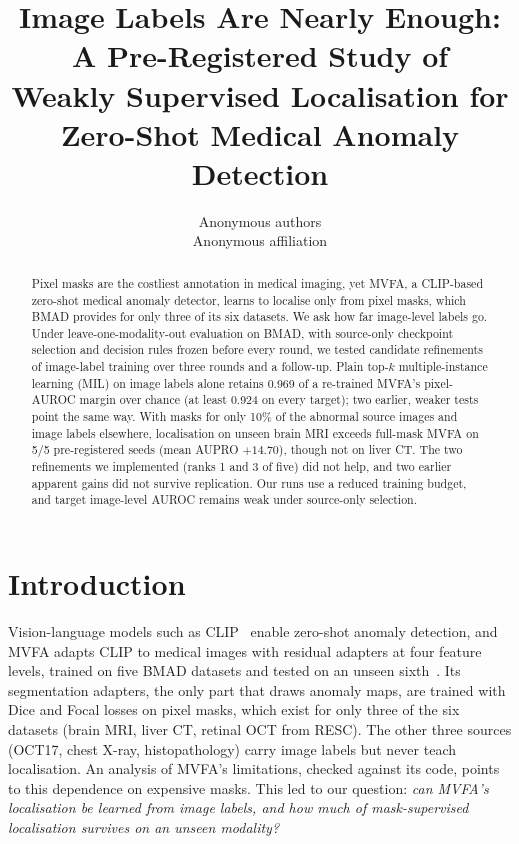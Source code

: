 \documentclass[10pt,twocolumn,letterpaper]{article}
\title{Image Labels Are Nearly Enough: A Pre-Registered Study of\\Weakly Supervised Localisation for Zero-Shot Medical Anomaly Detection}
\author{Anonymous authors\\Anonymous affiliation}
\begin{document}
\maketitle
\begin{abstract}
Pixel masks are the costliest annotation in medical imaging, yet MVFA, a CLIP-based zero-shot medical anomaly detector, learns to localise only from pixel masks, which BMAD provides for only three of its six datasets. We ask how far image-level labels go. Under leave-one-modality-out evaluation on BMAD, with source-only checkpoint selection and decision rules frozen before every round, we tested candidate refinements of image-label training over three rounds and a follow-up. Plain top-$k$ multiple-instance learning (MIL) on image labels alone retains 0.969 of a re-trained MVFA's pixel-AUROC margin over chance (at least 0.924 on every target); two earlier, weaker tests point the same way. With masks for only 10\% of the abnormal source images and image labels elsewhere, localisation on unseen brain MRI exceeds full-mask MVFA on 5/5 pre-registered seeds (mean AUPRO $+14.70$), though not on liver CT. The two refinements we implemented (ranks 1 and 3 of five) did not help, and two earlier apparent gains did not survive replication. Our runs use a reduced training budget, and target image-level AUROC remains weak under source-only selection.
\end{abstract}

\section{Introduction}
\label{sec:intro}
Vision-language models such as CLIP~\cite{clip2021} enable zero-shot anomaly detection, and MVFA adapts CLIP to medical images with residual adapters at four feature levels, trained on five BMAD datasets and tested on an unseen sixth~\cite{huang2024mvfa,bmad2024}. Its segmentation adapters, the only part that draws anomaly maps, are trained with Dice and Focal losses on pixel masks, which exist for only three of the six datasets (brain MRI, liver CT, retinal OCT from RESC). The other three sources (OCT17, chest X-ray, histopathology) carry image labels but never teach localisation. An analysis of MVFA's limitations, checked against its code, points to this dependence on expensive masks. This led to our question: \emph{can MVFA's localisation be learned from image labels, and how much of mask-supervised localisation survives on an unseen modality?}
\end{document}
